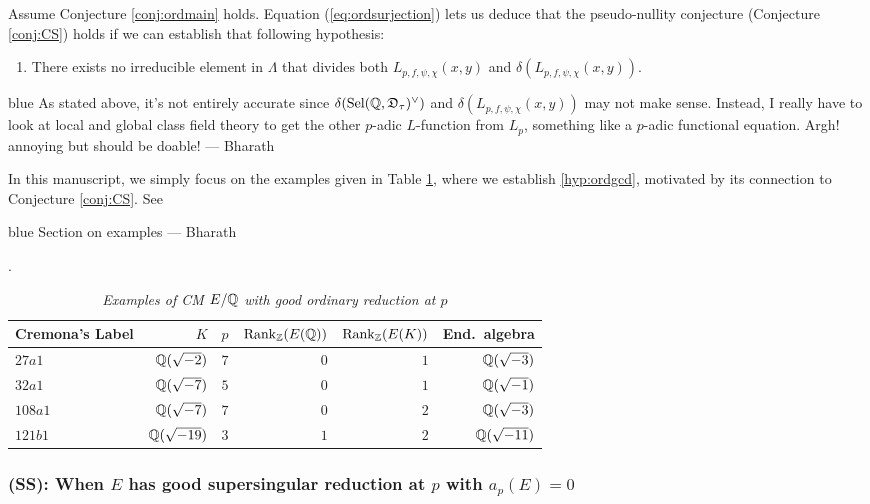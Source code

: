 \documentclass[a4paper,11pt]{article}
\newcommand{\BP}[1]{
	\begin{color}{blue}
		\marginpar{$\heartsuit$} #1
		--- Bharath
	\end{color}
}
\numberwithin{equation}{section}
\newcommand{\Sel}{\mathrm{Sel}}
\newcommand{\DDD}{\mathfrak{D}}
\begin{document}
Assume Conjecture \ref{conj:ordmain} holds. Equation (\ref{eq:ordsurjection}) lets us deduce that the pseudo-nullity conjecture (Conjecture \ref{conj:CS}) holds if we can establish that following hypothesis:
\begin{enumerate}[style=sameline, style=sameline, align=left,label=(\textsc{ord:gcd}) --- , ref=(\textsc{ord:gcd})]
\item\label{hyp:ssgcd} There exists no irreducible element in $\Lambda$ that divides both $L_{p,f,\psi,\chi}(x,y)$ and $\delta(L_{p,f,\psi,\chi}(x,y))$.
\end{enumerate}

\BP{As stated above, it's not entirely accurate since $\delta(\Sel(\Q,\DDD_\tau)^\vee)$ and $\delta(L_{p,f,\psi,\chi}(x,y))$ may not make sense. Instead, I really have to look at local and global class field theory to get the other $p$-adic $L$-function from $L_p$, something like a $p$-adic functional equation. Argh! annoying but should be doable!}

In this manuscript, we simply focus on the examples given in Table \ref{table:ordinary}, where we establish  \ref{hyp:ordgcd}, motivated by its connection to Conjecture \ref{conj:CS}. See \BP{Section on examples}.

\begin{table}[H]	\caption{\label{table:ordinary}\emph{Examples of CM $E/\mathbb{Q}$ with good ordinary reduction at $p$}}
\begin{tabular}[t]{lrrrrr}
	\toprule
 Cremona's Label          &  $K$    &  $p$    & $\mathrm{Rank}_{\mathbb{Z}}(E(\mathbb{Q}))$   & $\mathrm{Rank}_{\mathbb{Z}}(E(K))$ &   End.~algebra    \\ \midrule

$27a1$   &   $\mathbb{Q}(\sqrt{-2})$  &  $7$ &  $0$   &    $1$  & $\mathbb{Q}(\sqrt{-3})$   \\\addlinespace
$32a1$ &   $\mathbb{Q}(\sqrt{-7})$  & $5$    &  $0$   & $1$    & $\mathbb{Q}(\sqrt{-1})$   \\\addlinespace
$108a1$ &   $\mathbb{Q}(\sqrt{-7})$  & $7$    &  $0$   & $2$    & $\mathbb{Q}(\sqrt{-3})$   \\\addlinespace
$121b1$ &   $\mathbb{Q}(\sqrt{-19})$   &   $3$ &  $1$   & $2$    & $\mathbb{Q}(\sqrt{-11})$     \\
\bottomrule
\end{tabular}
\end{table}



\subsubsection*{(SS): When $E$ has good supersingular reduction at $p$ with $a_p(E)=0$}
\end{document}
